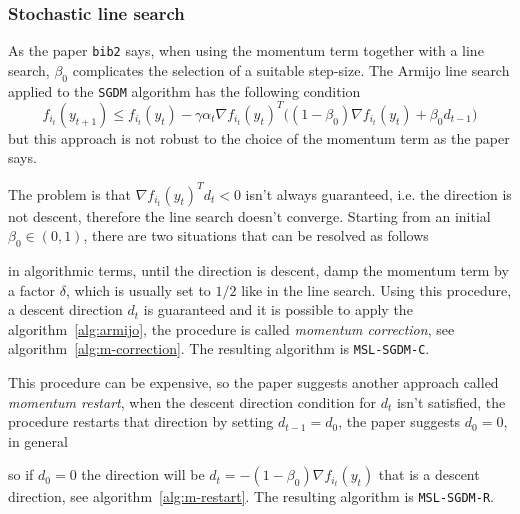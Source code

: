 \subsubsection{Stochastic line search}

As the paper \texttt{bib2} says, when using the momentum term together with a line search, $\beta_0$ complicates the selection of a suitable step-size. The Armijo line search applied to the \texttt{SGDM} algorithm has the following condition
\begin{equation}\label{eq:armijo-sgdm}
f_{i_t}(y_{t+1})\leq f_{i_t}(y_t)-\gamma\alpha_t\nabla f_{i_t}(y_t)^T\bigl((1-\beta_0)\nabla f_{i_t}(y_t)+\beta_0d_{t-1}\bigr)
\end{equation}
but this approach is not robust to the choice of the momentum term as the paper says.

The problem is that $\nabla f_{i_t}(y_t)^Td_t<0$ isn't always guaranteed, i.e. the direction is not descent, therefore the line search doesn't converge. Starting from an initial $\beta_0\in(0,1)$, there are two situations that can be resolved as follows
\begin{center}
\end{center}
in algorithmic terms, until the direction is descent, damp the momentum term by a factor $\delta$, which is usually set to $1/2$ like in the line search. Using this procedure, a descent direction $d_t$ is guaranteed and it is possible to apply the algorithm~\ref{alg:armijo}, the procedure is called \emph{momentum correction}, see algorithm~\vref{alg:m-correction}. The resulting algorithm is \texttt{MSL-SGDM-C}.

This procedure can be expensive, so the paper suggests another approach called \emph{momentum restart}, when the descent direction condition for $d_t$ isn't satisfied, the procedure restarts that direction by setting $d_{t-1}=d_0$, the paper suggests $d_0=0$, in general
\begin{center}
\end{center}
so if $d_0=0$ the direction will be $d_t=-(1-\beta_0)\nabla f_{i_t}(y_t)$ that is a descent direction, see algorithm~\vref{alg:m-restart}. The resulting algorithm is \texttt{MSL-SGDM-R}.
